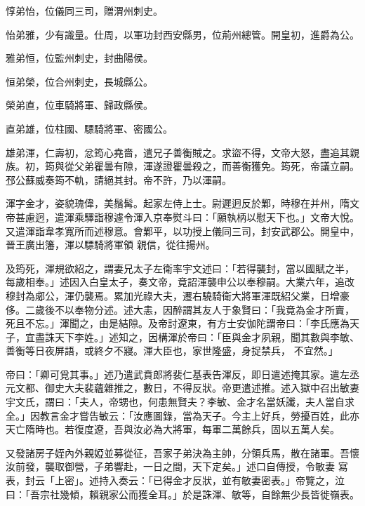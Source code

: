 \begin{pinyinscope}
 惇弟怡，位儀同三司，贈渭州刺史。



 怡弟雅，少有識量。仕周，以軍功封西安縣男，位荊州總管。開皇初，進爵為公。



 雅弟恒，位監州刺史，封曲陽侯。



 恒弟榮，位合州刺史，長城縣公。



 榮弟直，位車騎將軍、歸政縣侯。



 直弟雄，位柱國、驃騎將軍、密國公。



 雄弟渾，仁壽初，忿筠心堯嗇，遣兄子善衡賊之。求盜不得，文帝大怒，盡追其親族。初，筠與從父弟瞿曇有隙，渾遂證瞿曇殺之，而善衡獲免。筠死，帝議立嗣。邳公蘇威奏筠不軌，請絕其封。帝不許，乃以渾嗣。



 渾字金才，姿貌瑰偉，美鬚髯。起家左侍上士。尉遲迥反於鄴，時穆在并州，隋文帝甚慮迥，遣渾乘驛詣穆遽令渾入京奉熨斗曰：「願執柄以慰天下也。」文帝大悅。又遣渾詣韋孝寬所而述穆意。會鄴平，以功授上儀同三司，封安武郡公。開皇中，晉王廣出籓，渾以驃騎將軍領
 親信，從往揚州。



 及筠死，渾規欲紹之，謂妻兄太子左衛率宇文述曰：「若得襲封，當以國賦之半，每歲相奉。」述因入白皇太子，奏文帝，竟詔渾襲申公以奉穆嗣。大業六年，追改穆封為郕公，渾仍襲焉。累加光祿大夫，遷右驍騎衛大將軍渾既紹父業，日增豪侈。二歲後不以奉物分述。述大恚，因醉謂其友人于象賢曰：「我竟為金才所賣，死且不忘。」渾聞之，由是結隙。及帝討遼東，有方士安伽陀謂帝曰：「李氏應為天子，宜盡誅天下李姓。」述知之，因構渾於帝曰：「臣與金才夙親，聞其數與李敏、善衡等日夜屏語，或終夕不寢。渾大臣也，家世隆盛，身捉禁兵，
 不宜然。」



 帝曰：「卿可覓其事。」述乃遣武賁郎將裴仁基表告渾反，即日遣述掩其家。遣左丞元文都、御史大夫裴蘊雜推之，數日，不得反狀。帝更遣述推。述入獄中召出敏妻宇文氏，謂曰：「夫人，帝甥也，何患無賢夫？李敏、金才名當妖讖，夫人當自求全。」因教言金才嘗告敏云：「汝應圖錄，當為天子。今主上好兵，勞擾百姓，此亦天亡隋時也。若復度遼，吾與汝必為大將軍，每軍二萬餘兵，固以五萬人矣。



 又發諸房子姪內外親婭並募從征，吾家子弟決為主帥，分領兵馬，散在諸軍。吾懷汝前發，襲取御營，子弟響赴，一日之間，天下定矣。」述口自傳授，令敏妻
 寫表，封云「上密」。述持入奏云：「已得金才反狀，並有敏妻密表。」帝覽之，泣曰：「吾宗社幾傾，賴親家公而獲全耳。」於是誅渾、敏等，自餘無少長皆徙嶺表。




\end{pinyinscope}
